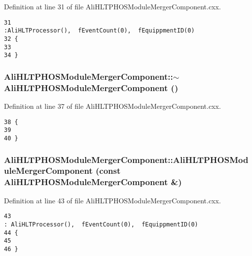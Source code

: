Definition at line 31 of file Ali\-HLTPHOSModule\-Merger\-Component.cxx.

\footnotesize\begin{verbatim}31                                                                  :AliHLTProcessor(),  fEventCount(0),  fEquippmentID(0)
32 {
33 
34 } 
\end{verbatim}\normalsize 


\subsubsection{\setlength{\rightskip}{0pt plus 5cm}Ali\-HLTPHOSModule\-Merger\-Component::$\sim${\bf Ali\-HLTPHOSModule\-Merger\-Component} ()\hspace{0.3cm}{\tt  [virtual]}}\label{classAliHLTPHOSModuleMergerComponent_a1}




Definition at line 37 of file Ali\-HLTPHOSModule\-Merger\-Component.cxx.

\footnotesize\begin{verbatim}38 {
39 
40 }
\end{verbatim}\normalsize 


\subsubsection{\setlength{\rightskip}{0pt plus 5cm}Ali\-HLTPHOSModule\-Merger\-Component::Ali\-HLTPHOSModule\-Merger\-Component (const {\bf Ali\-HLTPHOSModule\-Merger\-Component} \&)}\label{classAliHLTPHOSModuleMergerComponent_a2}




Definition at line 43 of file Ali\-HLTPHOSModule\-Merger\-Component.cxx.

\footnotesize\begin{verbatim}43                                                                                                           : AliHLTProcessor(),  fEventCount(0),  fEquippmentID(0)
44 {
45 
46 }
\end{verbatim}\normalsize 





